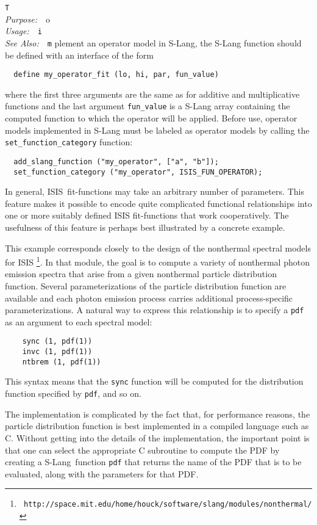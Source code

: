 \documentclass{book}
\makeatletter
\newif\ifpdf
\newcommand{\isis}{{\sc ISIS}}
\newcommand{\slang}{{\sc S-Lang}}
\newenvironment{isisfunction}[4]%
{\index{{#1}@{\tt #1}}%
  \ifpdf
  \else
     \addcontentsline{toc}{subsection}{{#1} -- {#2}}
  \fi
  \vbox{
          \vspace*{\baselineskip}
          {\LARGE\tt #1}\vspace*{\baselineskip}\\
          {{\it Purpose:}~~{#2}}\\
          {{\it Usage:}~~{\tt #3}}\\
          {{\it See Also:}~~{\tt #4}}
       }
}%
{ }
\makeatother
\begin{document}
\begin{isisfunction}
To implement an operator model in S-Lang, the S-Lang function
should be defined with an interface of the form
\begin{verbatim}
  define my_operator_fit (lo, hi, par, fun_value)
\end{verbatim}
where the first three arguments are the same as for additive
and multiplicative functions and the last argument
\verb|fun_value| is a S-Lang array containing the computed
function to which the operator will be applied. Before use,
operator models implemented in S-Lang must be labeled as
operator models by calling the \verb|set_function_category|
function:
\begin{verbatim}
  add_slang_function ("my_operator", ["a", "b"]);
  set_function_category ("my_operator", ISIS_FUN_OPERATOR);
\end{verbatim}

In general, \isis\ fit-functions may take an arbitrary number
of parameters.  This feature makes it possible to encode quite
complicated functional relationships into one or more suitably
defined ISIS fit-functions that work cooperatively. The
usefulness of this feature is perhaps best illustrated by a
concrete example.

This example corresponds closely to the design of the
nonthermal spectral models for \isis
\footnote{{\tt
http://space.mit.edu/home/houck/software/slang/modules/nonthermal/}}.
In that module, the goal is to compute a variety of nonthermal
photon emission spectra that arise from a given nonthermal
particle distribution function. Several
parameterizations of the particle distribution function are
available and each photon emission process carries additional
process-specific parameterizations.  A natural way to express
this relationship is to specify a \verb|pdf| as an argument
to each spectral model:
\begin{verbatim}
    sync (1, pdf(1))
    invc (1, pdf(1))
    ntbrem (1, pdf(1))
\end{verbatim}
This syntax means that the \verb|sync| function will be
computed for the distribution function specified by \verb|pdf|,
and so on.

The implementation is complicated by the fact that, for
performance reasons, the particle distribution function is best
implemented in a compiled language such as C.  Without getting
into the details of the implementation, the important point is
that one can select the appropriate C subroutine to compute the
PDF by creating a \slang\ function \verb|pdf| that returns the
name of the PDF that is to be evaluated, along with the
parameters for that PDF.


\end{isisfunction}
\end{document}
